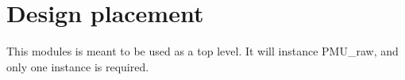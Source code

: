 \section{Design placement}
\label{chapter2}
This modules is meant to be used as a top level. It will instance PMU\_raw, and only one instance is required.




